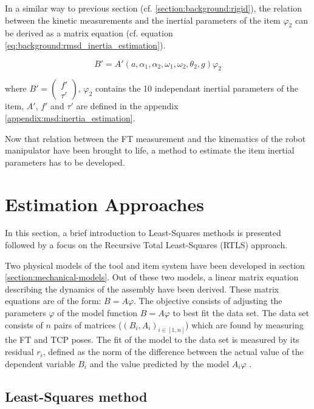 \documentclass[/home/francois/latex/report/main.tex]{subfiles}
\begin{document}
 In a similar way to previous section (cf. \ref{section:background:rigid}), the relation between the kinetic measurements and the inertial parameters of the item $\varphi_2$ can be derived as a matrix equation (cf. equation \ref{eq:background:rmsd_inertia_estimation}).

 \begin{equation}
   \label{eq:background:rmsd_inertia_estimation}
 B' = A'(a, \alpha_1, \alpha_2, \omega_1, \omega_2, \theta_2, g) \varphi_2
 \end{equation}

 where  $B' = \begin{pmatrix} f' \\ \tau' \end{pmatrix}$, $\varphi_2$ contains the 10 independant inertial parameters of the item, $A'$, $f'$ and $\tau'$ are defined in the appendix \ref{appendix:msd:inertia_estimation}.

Now that relation between the \ac{FT} measurement and the kinematics of the robot manipulator have been brought to life, a method to estimate the item inertial parameters has to be developed.

\section{Estimation Approaches}
\label{section:estimation}

In this section, a brief introduction to Least-Squares methods is presented followed by a focus on the Recursive Total Least-Squares (RTLS) approach.

Two physical models of the tool and item system have been developed in section \ref{section:mechanical-models}. Out of these two models, a linear matrix equation describing the dynamics of the assembly have been derived. These matrix equations are of the form: $B = A\varphi$. The objective consists of adjusting the parameters $\varphi$ of the model function $B = A\varphi$ to best fit the data set. The data set consists of $n$ pairs of matrices ($(B_i, A_i)_{i \in [1, n]}$) which are found by measuring the \ac{FT} and \ac{TCP} poses. The fit of the model to the data set is measured by its residual $r_i$, defined as the norm of the difference between the actual value of the dependent variable $B_i$ and the value predicted by the model $A_i \varphi$ \cite{Simoncelli2003}.

\subsection{Least-Squares method}
\label{subsection:ls}
\end{document}
